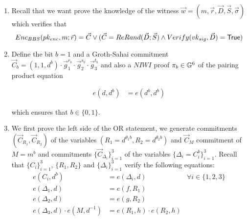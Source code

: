 \begin{description}
\begin{enumerate}
  \item Recall that we want prove the knowledge of the witness $\vec{w} = (m, \vec{r}, \vec{D}, \vec{S}, \vec{\sigma})$ which verifies that
    \begin{align*}
      Enc_{BBS}(pk_{enc}, m; \vec{r}) = \vec{C} \vee (\vec{C} = ReRand(\vec{D}; \vec{S}) \wedge Verify(vk_{sig}, \vec{D}) = \mathsf{True})
    \end{align*}
    
  \item Define the bit $b = 1$ and a Groth-Sahai commitment $\vec{C}_b = (1,1,d^b)\cdot \vec{g}_1^{r_b} \cdot \vec{g}_2^{s_b} \cdot \vec{g}_3^{t_b}$ and also a $NIWI$ proof $\pi_b \in \mathbb{G}^6$ of the pairing product equation 
  
  \begin{align}
  e(d,\boxed{d^b}) &= e(\boxed{d^b},\boxed{d^b}) \tag{1}
  \end{align}
  
  which ensures that $b \in \{0,1\}$.

  \item We first prove the left side of the OR statement, we generate commitments $(\vec{C}_{R_1}, \vec{C}_{R_2})$ of the variables $(R_1 = d^{\theta_1b}, R_2 = d^{\theta_2b})$ and $\vec{C}_{M}$ commitment of $M = m^b$ and commitments $\{\vec{C}_{\Delta_i}\}_{i=1}^3$ of the variables $\{\Delta_i = C_i^b\}_{i=1}^3$. Recall that $\{C_i\}_{i=1}^3$, $\{R_1,R_2\}$ and $\{\Delta_i\}_{i=1}^3$ verify the following equations:
    \begin{align}
      e(C_i,\boxed{d^b}) &= e(\boxed{\Delta_i}, d)  &\forall i \in \{1,2,3\} \tag{2,3,4}\\
      e(\boxed{\Delta_1},d) &= e(f, \boxed{R_1}) \tag{5}\\
      e(\boxed{\Delta_2},d) &= e(g, \boxed{R_2}) \tag{6}\\
      e(\boxed{\Delta_3},d) \cdot e(\boxed{M},d^{-1}) &= e(\boxed{R_1}, h) \cdot e(\boxed{R_2},h) \tag{7}
    \end{align}




\end{enumerate}
\end{description}
